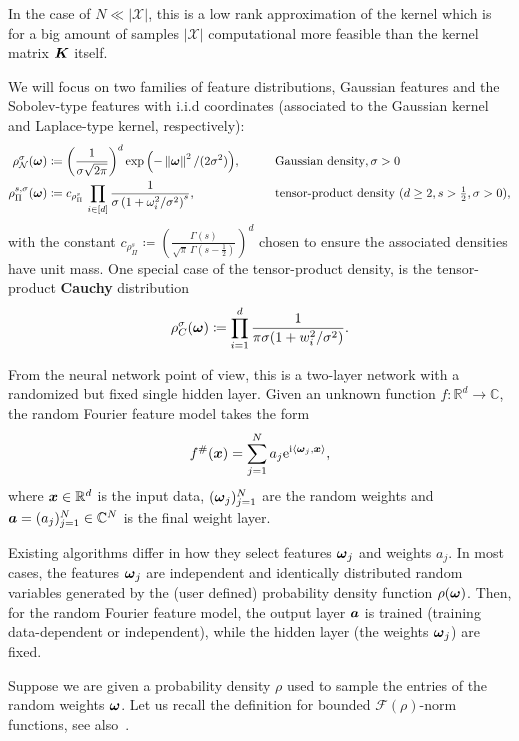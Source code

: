 \documentclass{article}
\renewcommand{\vec}[1]{\ensuremath \mathbf{\boldsymbol{#1}}}
\newcommand{\X}{\ensuremath{\mathcal{X}}}
\newcommand{\w}{\ensuremath{\vec \omega}}
\newcommand{\G}{\ensuremath{\mathcal{N}}} %
\newcommand{\x}{\ensuremath{\vec x}}
\newcommand{\F}{\ensuremath{\mathcal{F}}}
\newcommand{\R}{\ensuremath{\mathbb{R}}}
\newcommand{\C}{\ensuremath{\mathbb{C}}}
\newcommand{\e}{\mathrm{e}}
\newcommand{\im}{\mathrm{i}}
\newcommand{\norm}[1]{\left\lVert {#1} \right\rVert}    %
\theoremstyle{definition}
\numberwithin{equation}{section}
\begin{document}
In the case of $N \ll |\X|$, this is a low rank approximation of the kernel which is for a big amount of samples $|\X|$ computational more feasible than the kernel matrix $\vec K$ itself. \par

We will focus on two families of feature distributions, Gaussian features and the Sobolev-type features with i.i.d coordinates (associated to the Gaussian kernel and Laplace-type kernel, respectively):
\begin{align}
\rho^\sigma_{\G}(\w) &\coloneqq \left(\frac{1}{\sigma\sqrt{2\pi}}\right)^d\exp{\left(-\norm{\w}^2/(2\sigma^2)\right)},\quad \quad && \text{Gaussian density}, \sigma>0 \label{eq:Gauss}\\
\rho^{s,\sigma}_{\Pi}(\w) &\coloneqq  c_{\rho_\Pi^s} \,\prod_{i\in [d]}\frac{1}{\sigma \left(1+\omega_i^2/\sigma^2\right)^s}, && \text{tensor-product density } (d\geq 2, s>\tfrac 12,\sigma>0 ),\label{eq:rho_s}
\end{align}
with the constant $c_{\rho_\Pi^s} \coloneqq  \left(\frac{\Gamma(s)}{\sqrt{\pi}\,\Gamma(s-\tfrac 12)}\right)^d$ 
chosen to ensure the associated densities have unit mass. 
One special case of the tensor-product density, is the tensor-product \textbf{Cauchy} distribution 
\begin{equation}\label{eq:Cauchy}
\rho^{\sigma}_{C}(\w) \coloneqq  \prod_{i = 1}^d \frac{1}{\pi \sigma (1+w_{i}^2/\sigma^2)}.
\end{equation}

From the neural network point of view, this is a two-layer network
with a randomized but fixed single hidden layer. Given an unknown function
$f \colon  \R^d \rightarrow \C$, the random Fourier feature model takes the form 
$$f^\#(\x) = \sum_{j = 1}^Na_j \e^{\im \langle\w_j,\vec x\rangle},$$ 
where $\x\in \R^d$ is the
input data, $(\w_j)_{j=1}^N$ are the random weights and $\vec a = (a_j)_{j=1}^N\in \C^N$ is the final weight layer.

Existing algorithms differ in how they select features $\w_j$ and weights $a_j$. In most cases, the features $\w_j$ are independent and identically distributed random variables generated by the (user defined) probability density function $\rho(\w)$. Then, for the random Fourier feature model, the output layer $\vec a$ is
trained (training data-dependent or independent), while the hidden layer (the weights $\w_j$) are fixed. \par

Suppose we are given a probability density $\rho$ used to sample the entries of the random weights $\w$.
Let us recall the definition for bounded $\F(\rho)$-norm functions, see also~\cite{Ha23, Xie22, HARFE23}.
\end{document}
